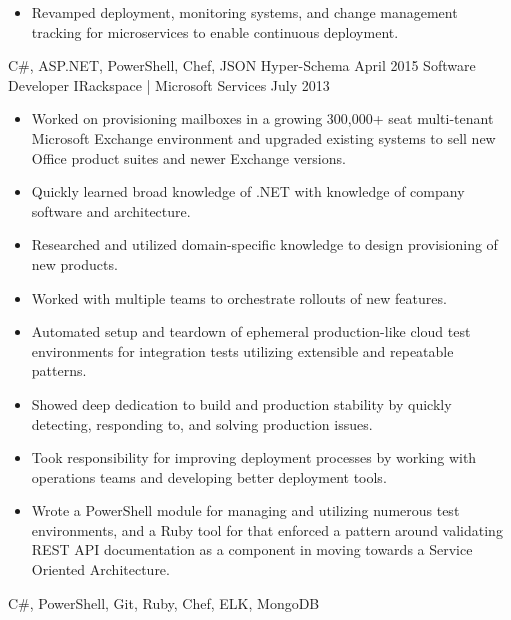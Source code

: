 \begin{experiences}
{\begin{itemize}
                        \item Revamped deployment, monitoring systems, and change management tracking for microservices to enable continuous deployment.
                      \end{itemize}
                    }
                    {C\#, ASP.NET, PowerShell, Chef, JSON Hyper-Schema}
  \emptySeparator
  \experience
  {April 2015}       {Software Developer I}{Rackspace | Microsoft Services}
  {July 2013}        {
                      \begin{itemize}
                        \item Worked on provisioning mailboxes in a growing 300,000+ seat multi-tenant Microsoft Exchange environment and upgraded existing systems to sell new Office product suites and newer Exchange versions.
                        \item Quickly learned broad knowledge of .NET with knowledge of company software and architecture.
                        \item Researched and utilized domain-specific knowledge to design provisioning of new products.
                        \item Worked with multiple teams to orchestrate rollouts of new features.
                        \item Automated setup and teardown of ephemeral production-like cloud test environments for integration tests utilizing extensible and repeatable patterns.
                        \item Showed deep dedication to build and production stability by quickly detecting, responding to, and solving production issues.
                        \item Took responsibility for improving deployment processes by working with operations teams and developing better deployment tools.
                        \item Wrote a PowerShell module for managing and utilizing numerous test environments, and a Ruby tool for that enforced a pattern around validating REST API documentation as a component in moving towards a Service Oriented Architecture.
                      \end{itemize}
                    }
                    {C\#, PowerShell, Git, Ruby, Chef, ELK, MongoDB}
\end{experiences}
